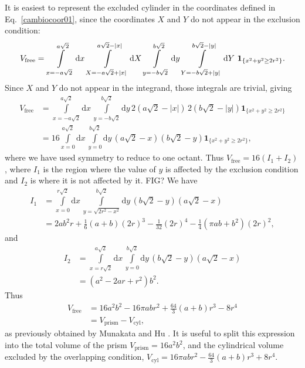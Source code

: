 \documentclass[superscriptaddress,pre,reprint,showpacs,onecolumn]{revtex4-1}
\newcommand{\rd}[1]{\mathrm{d}{#1} \,}
\newcommand{\indicatorsymbol}{\mathbf{1}}
\newcommand{\indicator}[1]{\indicatorsymbol_{ \{   #1 \} } }
\begin{document}
It is easiest to represent the  
excluded cylinder in the coordinates defined in 
Eq.~\ref{cambiocoor01}, since the coordinates $X$ and $Y$ 
do not appear in the exclusion condition:
\begin{equation}\label{integraltotal}
 V_\text{free} = \\ \int\limits_{x=-a \sqrt{2}}^{a \sqrt{2}} \rd x 
\int\limits_{X=-a \sqrt{2} + |x| }^{a \sqrt{2} - |x|}  \rd X
 \int\limits_{y=-b \sqrt{2}}^{b \sqrt{2}} \rd y
\int\limits_{Y=-b \sqrt{2} + |y| }^{b \sqrt{2}-|y|}  \rd Y
\, \indicator{ x^2 + y^2 \ge 2r^2  }.
\end{equation}
Since $X$ and $Y$ do not appear in the integrand, those integrals are trivial, giving
\begin{align}
 V_\text{free}  &= \int\limits_{x=-a \sqrt{2}}^{a \sqrt{2}} \rd x  \int\limits_{y=-b \sqrt{2}}^{b \sqrt{2}} \rd y
2 \left( a \sqrt{2} - |x| \right) \, 2 \left( b \sqrt{2} - |y| \right) \indicator{ x^2 + y^2 \ge 2r^2 } \\
 &= 16 \int\limits_{x=0}^{a \sqrt{2}} \rd x  \int\limits_{y=0}^{b \sqrt{2}} \rd y 
\left( a \sqrt{2} - x \right) \left( b \sqrt{2} - y \right) \indicator{ x^2 + y^2 \ge 2r^2 },
\end{align}
where we have used symmetry to reduce to one octant.
Thus $V_\text{free} = 16(I_1 + I_2)$, where $I_1$ is the region where the value of $y$
is affected by the exclusion condition and $I_2$ is where it is not affected
by it.  FIG?
We have
\begin{align}
 I_1 &= \int\limits_{x=0}^{r\sqrt{2}} \rd x \int\limits_{y = \sqrt{ 2r^2 - x^2}}^{b \sqrt{2}} \rd y
\left( b \sqrt{2} - y \right)  \left( a \sqrt{2} - x \right) \\
&= 	
2 a b^{2} r  + \textstyle \frac{1}{6} (a+b) (2r)^{3} - \frac{1}{32}  (2r)^{4} - \frac{1}{4} {\left(\pi a b + b^{2}\right)} (2r)^2,
\end{align}
and
\begin{align}
 I_2 &= \int\limits_{x=r  \sqrt{2}}^{a \sqrt{2}} \rd x  \int\limits_{y = 0}^{b \sqrt{2}} \rd y
 \left( b \sqrt{2} - y \right)  \left( a \sqrt{2} - x \right)  \\
&=	
{\left( a^{2} - 2ar +   r^{2}\right)} b^{2}.
\end{align}
Thus 
\begin{align}\label{volumeabd}
 V_\text{free}
 & =  16 a^{2} b^{2}  - 16 \pi a b r^{2} + \textstyle \frac{64}{3} (a+b) r^{3}  - 8 r^{4} \\
&= V_\text{prism} - V_\text{cyl},
\end{align}
as previously obtained by Munakata and Hu \cite{Munakata02}.
It is useful to split this expression into the total volume of the prism 
$V_\text{prism}=16 a^2 b^2$, and the cylindrical volume excluded by the overlapping
condition, 
$V_\text{cyl}=  16 \pi a b r^{2} - \textstyle \frac{64}{3} (a+b) r^{3}  + 8 r^{4}$.
\end{document}
